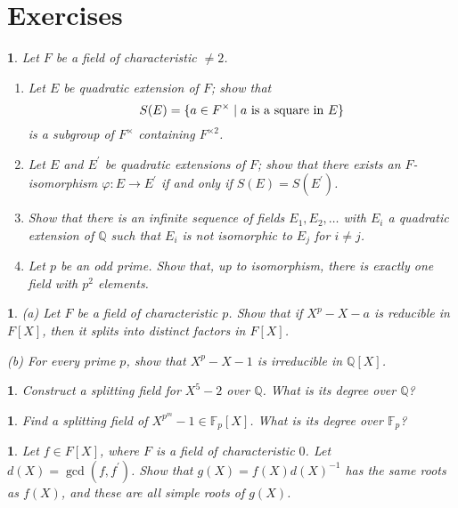 \documentclass[a4paper,11pt,final,openany]{memoir}
\newtheorem{exercise}[Y]{}
\theoremstyle{nonumberplain}
\begin{document}
\section{Exercises}

\begin{exercise}
\label{x5} Let $F$ be a field of characteristic $\neq2$.

\begin{enumerate}
\item Let $E$ be quadratic extension of $F$; show that
\[
S(E)=\{a\in F^{\times}\mid a\text{\textrm{\ }is a square in\textrm{\ }}E\}
\]
is a subgroup of $F^{\times}$ containing $F^{\times2}$.

\item Let $E$ and $E^{\prime}$ be quadratic extensions of $F$; show that there
exists an $F$-isomorphism $\varphi\colon E\rightarrow E^{\prime}$ if and only
if $S(E)=S(E^{\prime})$.

\item Show that there is an infinite sequence of fields $E_{1},E_{2},\ldots$
with $E_{i}$ a quadratic extension of ${\mathbb{Q}}$ such that $E_{i}$ is not
isomorphic to $E_{j}$ for $i\neq j$.

\item Let $p$ be an odd prime. Show that, up to isomorphism, there is exactly
one field with $p^{2}$ elements.
\end{enumerate}
\end{exercise}

\begin{exercise}
\label{x6} (a) Let $F$ be a field of characteristic $p$. Show that if
$X^{p}-X-a$ is reducible in $F[X]$, then it splits into distinct factors in
$F[X]$.

(b) For every prime $p$, show that $X^{p}-X-1$ is irreducible in ${\mathbb{Q}%
}[X]$.
\end{exercise}

\begin{exercise}
\label{x7} Construct a splitting field for $X^{5}-2$ over ${\mathbb{Q}}$. What
is its degree over ${\mathbb{Q}}$?
\end{exercise}

\begin{exercise}
\label{x8} Find a splitting field of $X^{p^{m}}-1\in\mathbb{F}_{p}[X]$. What
is its degree over $\mathbb{F}_{p}$?
\end{exercise}

\begin{exercise}
\label{x9} Let $f\in F[X]$, where $F$ is a field of characteristic $0$. Let
$d(X)=\gcd(f,f^{\prime})$. Show that $g(X)=f(X)d(X)^{-1}$ has the same roots
as $f(X)$, and these are all simple roots of $g(X)$.
\end{exercise}
\end{document}
